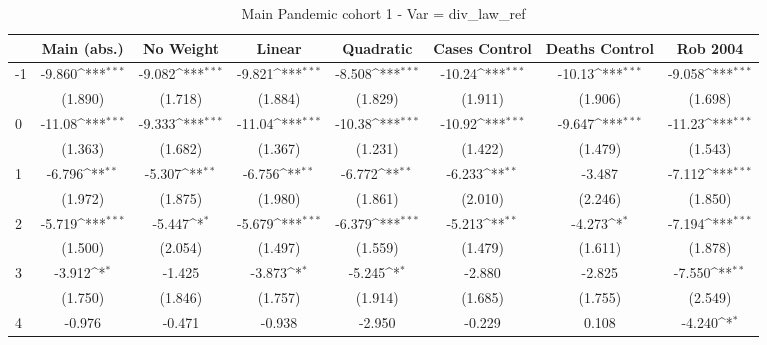 \documentclass{article}
\begin{document}
{
\def\sym#1{\ifmmode^{#1}\else\(^{#1}\)\fi}
\begin{longtable}{l*{7}{c}}
\caption{Main Pandemic cohort 1 - Var = div\_law\_ref}\\
\hline\hline\endfirsthead\hline\endhead\hline\endfoot\endlastfoot
                &\multicolumn{1}{c}{Main (abs.)}&\multicolumn{1}{c}{No Weight}&\multicolumn{1}{c}{Linear}&\multicolumn{1}{c}{Quadratic}&\multicolumn{1}{c}{Cases Control}&\multicolumn{1}{c}{Deaths Control}&\multicolumn{1}{c}{Rob 2004}\\
\hline
-1              &   -9.860\sym{***}&   -9.082\sym{***}&   -9.821\sym{***}&   -8.508\sym{***}&   -10.24\sym{***}&   -10.13\sym{***}&   -9.058\sym{***}\\
                &  (1.890)         &  (1.718)         &  (1.884)         &  (1.829)         &  (1.911)         &  (1.906)         &  (1.698)         \\
0               &   -11.08\sym{***}&   -9.333\sym{***}&   -11.04\sym{***}&   -10.38\sym{***}&   -10.92\sym{***}&   -9.647\sym{***}&   -11.23\sym{***}\\
                &  (1.363)         &  (1.682)         &  (1.367)         &  (1.231)         &  (1.422)         &  (1.479)         &  (1.543)         \\
1               &   -6.796\sym{**} &   -5.307\sym{**} &   -6.756\sym{**} &   -6.772\sym{**} &   -6.233\sym{**} &   -3.487         &   -7.112\sym{***}\\
                &  (1.972)         &  (1.875)         &  (1.980)         &  (1.861)         &  (2.010)         &  (2.246)         &  (1.850)         \\
2               &   -5.719\sym{***}&   -5.447\sym{*}  &   -5.679\sym{***}&   -6.379\sym{***}&   -5.213\sym{**} &   -4.273\sym{*}  &   -7.194\sym{***}\\
                &  (1.500)         &  (2.054)         &  (1.497)         &  (1.559)         &  (1.479)         &  (1.611)         &  (1.878)         \\
3               &   -3.912\sym{*}  &   -1.425         &   -3.873\sym{*}  &   -5.245\sym{*}  &   -2.880         &   -2.825         &   -7.550\sym{**} \\
                &  (1.750)         &  (1.846)         &  (1.757)         &  (1.914)         &  (1.685)         &  (1.755)         &  (2.549)         \\
4               &   -0.976         &   -0.471         &   -0.938         &   -2.950         &   -0.229         &    0.108         &   -4.240\sym{*}  \\

\end{longtable}}
\end{document}

